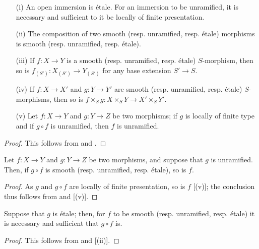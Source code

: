 \begin{proposition}[17.3.3]
\label{IV.17.3.3}
\medskip\noindent
\begin{enumerate}
  \item[{\rm(i)}] An open immersion is \'etale.
    For an immersion to be unramified, it is necessary and sufficient to it be locally of finite presentation.
  \item[{\rm(ii)}] The composition of two smooth (resp. unramified, resp. \'etale) morphisms is smooth (resp. unramified, resp. \'etale).
  \item[{\rm(iii)}] If $f:X\to Y$ is a smooth (resp. unramified, resp. \'etale) $S$-morphism, then so is $f_{(S')}:X_{(S')}\to Y_{(S')}$ for any base extension $S'\to S$. 
  \item[{\rm(iv)}] If $f:X\to X'$ and $g:Y\to Y'$ are smooth (resp. unramified, resp. \'etale) $S$-morphisms, then so is $f\times_S g:X\times_S Y\to X'\times_S Y'$.
  \item[{\rm(v)}] Let $f:X\to Y$ and $g:Y\to Z$ be two morphisms;
    if $g$ is locally of finite type and if $g\circ f$ is unramified, then $f$ is unramified.
\end{enumerate}
\end{proposition}

\begin{proof}
This follows from  and .
\end{proof}

\begin{proposition}[17.3.4]
\label{IV.17.3.4}
Let $f:X\to Y$ and $g:Y\to Z$ be two morphisms, and suppose that $g$ is unramified.
Then, if $g\circ f$ is smooth (resp. unramified, resp. \'etale), so is $f$.
\end{proposition}

\begin{proof}
As $g$ and $g\circ f$ are locally of finite presentation, so is $f$ [(v)];
the conclusion thus follows from  and [(v)].
\end{proof}

\begin{corollary}[17.3.5]
\label{IV.17.3.5}
Suppose that $g$ is \'etale;
then, for $f$ to be smooth (resp. unramified, resp. \'etale) it is necessary and sufficient that $g\circ f$ is.
\end{corollary}

\begin{proof}
This follows from  and [(ii)].
\end{proof}

